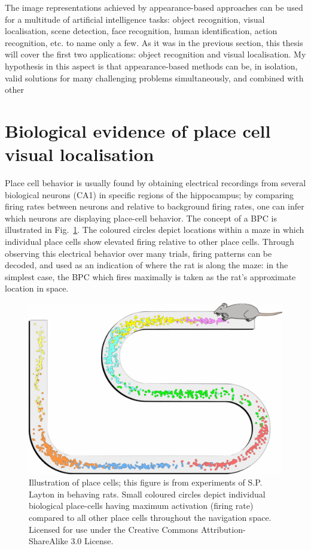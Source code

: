 The image representations achieved by appearance-based approaches can be used for a multitude of artificial intelligence tasks: object recognition, visual localisation, scene detection, face recognition, human identification, action recognition, etc. to name only a few. As it was in the previous section, this thesis will cover the first two applications: object recognition and visual localisation. My hypothesis in this aspect is that appearance-based methods can be, in isolation, valid solutions for many challenging problems simultaneously, and combined with other 

 

\section{Biological evidence of place cell visual localisation} 

Place cell behavior is usually found by obtaining electrical recordings from several biological neurons (CA1) in specific regions of the hippocampus; by comparing firing rates between neurons and relative to background firing rates, one can infer which neurons are displaying place-cell behavior. The concept of a BPC is illustrated in Fig.~\ref{fig:Maze}.  The coloured circles depict locations within a maze in which individual place cells show elevated firing relative to other place cells.  Through observing this electrical behavior over many trials, firing patterns can be decoded, and used as an indication of where the rat is along the maze: in the simplest case, the BPC which fires maximally is taken as the rat's approximate location in space. \\

\begin{figure}[!t]
\centering
\includegraphics[width=.6\linewidth]{./gfx/Chapter01/bio_place_cells_rat.pdf}
\caption{Illustration of place cells; this figure is from experiments of S.P. Layton in behaving rats. Small coloured circles depict individual biological place-cells having maximum activation (firing rate) compared to all other place cells throughout the navigation space. Licensed for use under the Creative Commons Attribution-ShareAlike 3.0 License.}
\label{fig:Maze}
\end{figure}

